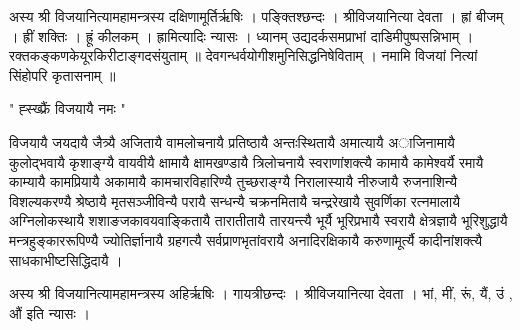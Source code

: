 अस्य श्री विजयानित्यामहामन्त्रस्य दक्षिणामूर्तिर्ऋषिः । पङ्क्तिश्छन्दः । श्रीविजयानित्या देवता । ह्रां बीजम् । ह्रीं शक्तिः । ह्रूं कीलकम् ।
ह्रामित्यादिः न्यासः ।
ध्यानम् उद्यदर्कसमप्राभां दाडिमीपुष्पसन्निभाम् । रक्तकङ्कणकेयूरकिरीटाङ्गदसंयुताम् ॥
देवगन्धर्वयोगीशमुनिसिद्धनिषेविताम् । नमामि विजयां नित्यां सिंहोपरि कृतासनाम् ॥

" ह्स्ख्फ्रैं विजयायै नमः "

विजयायै जयदायै जैत्र्यै अजितायै वामलोचनायै प्रतिष्ठायै अन्तःस्थितायै अमात्यायै अाजिनामायै कुलोद्भवायै कृशाङ्ग्यै वायवीयै क्षामायै क्षामखण्डायै त्रिलोचनायै स्वराणांशक्त्यै कामायै कामेश्वर्यै रमायै  काम्यायै कामप्रियायै अकामायै कामचारविहारिण्यै तुच्छराङ्ग्यै निरालास्यायै नीरुजायै रुजनाशिन्यै विशल्यकरण्यै श्रेष्ठायै मृतसञ्जीविन्यै परायै सन्धन्यै चक्रनमितायै चन्द्ररेखायै सुवर्णिका रत्नमालायै अग्निलोकस्थायै शशाङजकावयवाङ्कितायै तारातीतायै तारयन्त्यै भूर्यै भूरिप्रभायै स्वरायै क्षेत्रज्ञायै भूरिशुद्धायै मन्त्रहुङ्काररूपिण्यै ज्योतिर्ज्ञानायै ग्रहगत्यै सर्वप्राणभृतांवरायै अनादिरक्षिकायै करुणामूर्त्यै कादीनांशक्त्यै साधकाभीष्टसिद्धिदायै ।


अस्य श्री विजयानित्यामहामन्त्रस्य अहिर्ऋषिः । गायत्रीछन्दः । श्रीविजयानित्या देवता ।
भां, मीं, रूं, यैं, उं , औं  इति न्यासः ।
